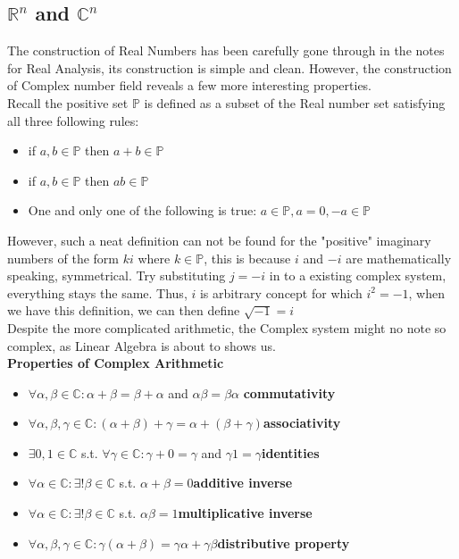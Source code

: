\documentclass{article}
\newcommand{\0}{{\bf{0}}}
\begin{document}
\subsection{$\mathbb{R}^n$ and $\mathbb{C}^n$}
The construction of Real Numbers has been carefully gone through in the notes for Real Analysis, its construction is simple and clean. However, the construction of Complex number field reveals a few more interesting properties.\\
Recall the positive set $\mathbb{P}$ is defined as a subset of the Real number set satisfying all three following rules:
\begin{itemize}
    \item if $a,b\in\mathbb{P}$ then $a+b\in\mathbb{P}$
    \item if $a,b\in\mathbb{P}$ then $ab\in\mathbb{P}$
    \item One and only one of the following is true: $a\in\mathbb{P},a=0,-a\in\mathbb{P}$
\end{itemize}
However, such a neat definition can not be found for the "positive" imaginary numbers of the form $ki$ where $k\in\mathbb{P}$, this is because $i$ and $-i$ are mathematically speaking, symmetrical. Try substituting $j=-i$ in to a existing complex system, everything stays the same.
Thus, $i$ is arbitrary concept for which $i^2=-1$, when we have this definition, we can then define $\sqrt{-1}=i$\\
Despite the more complicated arithmetic, the Complex system might no note so complex, as Linear Algebra is about to shows us.
$$$$
{\textbf{Properties of Complex Arithmetic}}
\begin{itemize}
    \item $\forall\alpha,\beta\in\mathbb{C}:\alpha+\beta=\beta+\alpha$ and $\alpha\beta=\beta\alpha$ \null\hfill{\textbf{commutativity}}
    \item $\forall\alpha,\beta,\gamma\in\mathbb{C}:(\alpha+\beta)+\gamma=\alpha+(\beta+\gamma)$\null\hfill{\textbf{associativity}}
    \item $\exists0,1\in\mathbb{C}$ s.t. $\forall\gamma\in\mathbb{C}:\gamma+0=\gamma$ and $\gamma1=\gamma$\null\hfill{\textbf{identities}}
    \item $\forall\alpha\in\mathbb{C}:\exists!\beta\in\mathbb{C}$ s.t. $\alpha+\beta=0$\null\hfill{\textbf{additive inverse}}
    \item $\forall\alpha\in\mathbb{C}:\exists!\beta\in\mathbb{C}$ s.t. $\alpha\beta=1$\null\hfill{\textbf{multiplicative inverse}}
    \item $\forall\alpha,\beta,\gamma\in\mathbb{C}:\gamma(\alpha+\beta)=\gamma\alpha+\gamma\beta$\null\hfill{\textbf{distributive property}}
\end{itemize}
\end{document}
